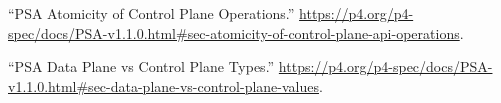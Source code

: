\documentclass[11pt]{article}
\begin{document}
{{\begin{thebibliography}{44}
\mdbibitemlabel{{}[27]}\textquotedblleft{}PSA Atomicity of Control Plane Operations.\textquotedblright{} \href{https://p4.org/p4-spec/docs/PSA-v1.1.0.html\%23sec-atomicity-of-control-plane-api-operations}{{\ttfamily https://\hspace{0pt}p4.\hspace{0pt}org/\hspace{0pt}p4-\hspace{0pt}spec/\hspace{0pt}docs/\hspace{0pt}PSA-\hspace{0pt}v1.\hspace{0pt}1.\hspace{0pt}0.\hspace{0pt}html\#\hspace{0pt}sec-\hspace{0pt}atomicity-\hspace{0pt}of-\hspace{0pt}control-\hspace{0pt}plane-\hspace{0pt}api-\hspace{0pt}operations}}.\label{psaatomicityofcontrolplaneops}%

\mdbibitemlabel{{}[28]}\textquotedblleft{}PSA Data Plane vs Control Plane Types.\textquotedblright{} \href{https://p4.org/p4-spec/docs/PSA-v1.1.0.html\%23sec-data-plane-vs-control-plane-values}{{\ttfamily https://\hspace{0pt}p4.\hspace{0pt}org/\hspace{0pt}p4-\hspace{0pt}spec/\hspace{0pt}docs/\hspace{0pt}PSA-\hspace{0pt}v1.\hspace{0pt}1.\hspace{0pt}0.\hspace{0pt}html\#\hspace{0pt}sec-\hspace{0pt}data-\hspace{0pt}plane-\hspace{0pt}vs-\hspace{0pt}control-\hspace{0pt}plane-\hspace{0pt}values}}.\label{psatranslation}%


\end{thebibliography}}}
\end{document}
